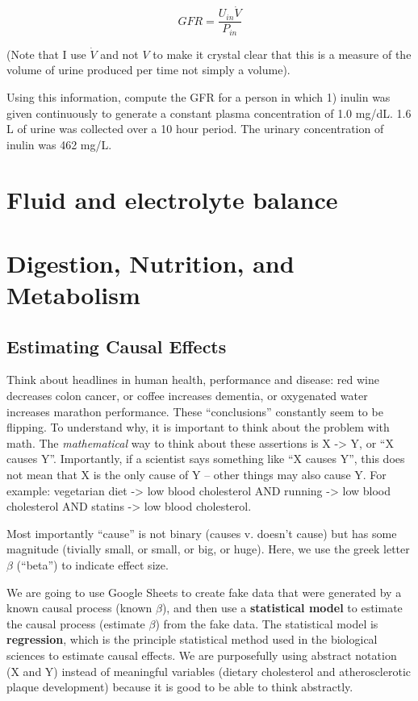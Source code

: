 \documentclass[]{book}
\begin{document}
\begin{equation}
GFR = \frac{U_{in} \dot{V}}{P_{in}}
\end{equation}

(Note that I use \(\dot{V}\) and not \(V\) to make it crystal clear that
this is a measure of the volume of urine produced per time not simply a
volume).

Using this information, compute the GFR for a person in which 1) inulin
was given continuously to generate a constant plasma concentration of
1.0 mg/dL. 1.6 L of urine was collected over a 10 hour period. The
urinary concentration of inulin was 462 mg/L.

\chapter{Fluid and electrolyte
balance}\label{fluid-and-electrolyte-balance}

\chapter{Digestion, Nutrition, and
Metabolism}\label{digestion-nutrition-and-metabolism}

\section{Estimating Causal Effects}\label{estimating-causal-effects}

Think about headlines in human health, performance and disease: red wine
decreases colon cancer, or coffee increases dementia, or oxygenated
water increases marathon performance. These ``conclusions'' constantly
seem to be flipping. To understand why, it is important to think about
the problem with math. The \emph{mathematical} way to think about these
assertions is X -\textgreater{} Y, or ``X causes Y''. Importantly, if a
scientist says something like ``X causes Y'', this does not mean that X
is the only cause of Y -- other things may also cause Y. For example:
vegetarian diet -\textgreater{} low blood cholesterol AND running
-\textgreater{} low blood cholesterol AND statins -\textgreater{} low
blood cholesterol.

Most importantly ``cause'' is not binary (causes v. doesn't cause) but
has some magnitude (tivially small, or small, or big, or huge). Here, we
use the greek letter \(\beta\) (``beta'') to indicate effect size.

We are going to use Google Sheets to create fake data that were
generated by a known causal process (known \(\beta\)), and then use a
\textbf{statistical model} to estimate the causal process (estimate
\(\beta\)) from the fake data. The statistical model is
\textbf{regression}, which is the principle statistical method used in
the biological sciences to estimate causal effects. We are purposefully
using abstract notation (X and Y) instead of meaningful variables
(dietary cholesterol and atherosclerotic plaque development) because it
is good to be able to think abstractly.
\end{document}
